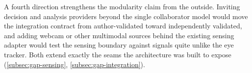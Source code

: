 A fourth direction strengthens the modularity claim from the outside.
Inviting decision and analysis providers beyond the single collaborator model would move the integration contract from author-validated toward independently validated, and adding webcam or other multimodal sources behind the existing sensing adapter would test the sensing boundary against signals quite unlike the eye tracker.
Both extend exactly the seams the architecture was built to expose (\cref{subsec:gap-sensing}, \cref{subsec:gap-integration}).
